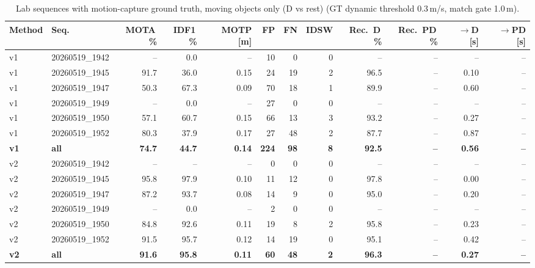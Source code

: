 \begin{table}[t]
\centering
\caption{Lab sequences with motion-capture ground truth, moving objects only (D vs rest) (GT dynamic threshold 0.3\,m/s, match gate 1.0\,m).}
\label{tab:own_r9c_dynamic_only}
\setlength{\tabcolsep}{3pt}
\begin{tabular}{llrrrrrrrrrr}
\toprule
Method & Seq. & MOTA\,\% & IDF1\,\% & MOTP [m] & FP & FN & IDSW & Rec.\ D\,\% & Rec.\ PD\,\% & $\to$D [s] & $\to$PD [s] \\
\midrule
v1 & 20260519\_1942 & -- & 0.0 & -- & 10 & 0 & 0 & -- & -- & -- & -- \\
v1 & 20260519\_1945 & 91.7 & 36.0 & 0.15 & 24 & 19 & 2 & 96.5 & -- & 0.10 & -- \\
v1 & 20260519\_1947 & 50.3 & 67.3 & 0.09 & 70 & 18 & 1 & 89.9 & -- & 0.60 & -- \\
v1 & 20260519\_1949 & -- & 0.0 & -- & 27 & 0 & 0 & -- & -- & -- & -- \\
v1 & 20260519\_1950 & 57.1 & 60.7 & 0.15 & 66 & 13 & 3 & 93.2 & -- & 0.27 & -- \\
v1 & 20260519\_1952 & 80.3 & 37.9 & 0.17 & 27 & 48 & 2 & 87.7 & -- & 0.87 & -- \\
\textbf{v1} & \textbf{all} & \textbf{74.7} & \textbf{44.7} & \textbf{0.14} & \textbf{224} & \textbf{98} & \textbf{8} & \textbf{92.5} & \textbf{--} & \textbf{0.56} & \textbf{--} \\
\midrule
v2 & 20260519\_1942 & -- & -- & -- & 0 & 0 & 0 & -- & -- & -- & -- \\
v2 & 20260519\_1945 & 95.8 & 97.9 & 0.10 & 11 & 12 & 0 & 97.8 & -- & 0.00 & -- \\
v2 & 20260519\_1947 & 87.2 & 93.7 & 0.08 & 14 & 9 & 0 & 95.0 & -- & 0.20 & -- \\
v2 & 20260519\_1949 & -- & 0.0 & -- & 2 & 0 & 0 & -- & -- & -- & -- \\
v2 & 20260519\_1950 & 84.8 & 92.6 & 0.11 & 19 & 8 & 2 & 95.8 & -- & 0.23 & -- \\
v2 & 20260519\_1952 & 91.5 & 95.7 & 0.12 & 14 & 19 & 0 & 95.1 & -- & 0.42 & -- \\
\textbf{v2} & \textbf{all} & \textbf{91.6} & \textbf{95.8} & \textbf{0.11} & \textbf{60} & \textbf{48} & \textbf{2} & \textbf{96.3} & \textbf{--} & \textbf{0.27} & \textbf{--} \\
\bottomrule
\end{tabular}
\end{table}
